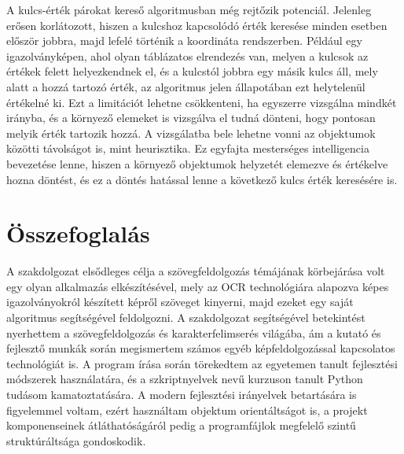 \documentclass[12pt]{report}
\begin{document}
A kulcs-érték párokat kereső algoritmusban még rejtőzik potenciál. Jelenleg erősen korlátozott, hiszen a kulcshoz kapcsolódó érték keresése minden esetben először jobbra, majd lefelé történik a koordináta rendszerben. Például egy igazolványképen, ahol olyan táblázatos elrendezés van, melyen a kulcsok az értékek felett helyezkendnek el, és a kulcstól jobbra egy másik kulcs áll, mely alatt a hozzá tartozó érték, az algoritmus jelen állapotában ezt helytelenül értékelné ki. Ezt a limitációt lehetne csökkenteni, ha egyszerre vizsgálna mindkét irányba, és a környező elemeket is vizsgálva el tudná dönteni, hogy pontosan melyik érték tartozik hozzá. A vizsgálatba bele lehetne vonni az objektumok közötti távolságot is, mint heurisztika.
Ez egyfajta mesterséges intelligencia bevezetése lenne, hiszen a környező objektumok helyzetét elemezve és értékelve hozna döntést, és ez a döntés hatással lenne a következő kulcs érték keresésére is.

\chapter*{Összefoglalás}

A szakdolgozat elsődleges célja a szövegfeldolgozás témájának körbejárása volt egy olyan alkalmazás elkészítésével, mely az OCR technológiára alapozva képes igazolványokról készített képről szöveget kinyerni, majd ezeket egy saját algoritmus segítségével feldolgozni. A szakdolgozat segítségével betekintést nyerhettem a szövegfeldolgozás és karakterfelimserés világába, ám a kutató és fejlesztő munkák során megismertem számos egyéb képfeldolgozással kapcsolatos technológiát is. A program írása során törekedtem az egyetemen tanult fejlesztési módszerek használatára, és a szkriptnyelvek nevű kurzuson tanult Python tudásom kamatoztatására.
A modern fejlesztési irányelvek betartására is figyelemmel voltam, ezért használtam objektum orientáltságot is, a projekt komponenseinek átláthatóságáról pedig a programfájlok megfelelő szintű struktúráltsága gondoskodik.
\end{document}
